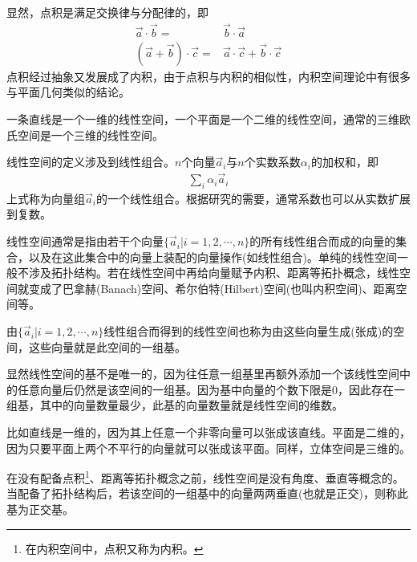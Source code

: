 显然，点积是满足交换律与分配律的，即
\begin{align*}
  \vec a\cdot \vec b={}&\vec b\cdot \vec a\\
  (\vec a + \vec b)\cdot \vec c ={}& \vec a\cdot \vec c + \vec b\cdot \vec c
\end{align*}
点积经过抽象又发展成了内积，由于点积与内积的相似性，内积空间理论中有很多与平面几何类似的结论。

\begin{example}
  一条直线是一个一维的线性空间，一个平面是一个二维的线性空间，通常的三维欧氏空间是一个三维的线性空间。

  线性空间的定义涉及到线性组合。$n$个向量$\vec a_i$与$n$个实数系数$\alpha_i$的加权和，即
  \begin{align*}
    \sum_i \alpha_i \vec a_i
  \end{align*}
  上式称为向量组$\vec a_i$的一个线性组合。根据研究的需要，通常系数也可以从实数扩展到复数。

  线性空间通常是指由若干个向量$\{\vec a_i|i=1,2,\cdots,n\}$的所有线性组合而成的向量的集合，以及在这此集合中的向量上装配的向量操作(如线性组合)。单纯的线性空间一般不涉及拓扑结构。若在线性空间中再给向量赋予内积、距离等拓扑概念，线性空间就变成了巴拿赫(Banach)空间、希尔伯特(Hilbert)空间(也叫内积空间)、距离空间等。

  由$\{\vec a_i|i=1,2,\cdots,n\}$线性组合而得到的线性空间也称为由这些向量生成(张成)的空间，这些向量就是此空间的一组基。

  显然线性空间的基不是唯一的，因为往任意一组基里再额外添加一个该线性空间中的任意向量后仍然是该空间的一组基。因为基中向量的个数下限是0，因此存在一组基，其中的向量数量最少，此基的向量数量就是线性空间的维数。

  比如直线是一维的，因为其上任意一个非零向量可以张成该直线。平面是二维的，因为只要平面上两个不平行的向量就可以张成该平面。同样，立体空间是三维的。

  在没有配备点积\footnote{在内积空间中，点积又称为内积。}、距离等拓扑概念之前，线性空间是没有角度、垂直等概念的。当配备了拓扑结构后，若该空间的一组基中的向量两两垂直(也就是正交)，则称此基为正交基。
\end{example}

